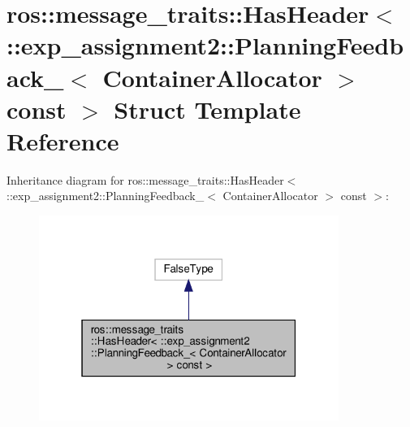 \hypertarget{structros_1_1message__traits_1_1HasHeader_3_01_1_1exp__assignment2_1_1PlanningFeedback___3_01Con25602f3962efee2b3ff1c0f0e827ff30}{}\section{ros\+:\+:message\+\_\+traits\+:\+:Has\+Header$<$ \+:\+:exp\+\_\+assignment2\+:\+:Planning\+Feedback\+\_\+$<$ Container\+Allocator $>$ const $>$ Struct Template Reference}
\label{structros_1_1message__traits_1_1HasHeader_3_01_1_1exp__assignment2_1_1PlanningFeedback___3_01Con25602f3962efee2b3ff1c0f0e827ff30}


Inheritance diagram for ros\+:\+:message\+\_\+traits\+:\+:Has\+Header$<$ \+:\+:exp\+\_\+assignment2\+:\+:Planning\+Feedback\+\_\+$<$ Container\+Allocator $>$ const $>$\+:
\nopagebreak
\begin{figure}[H]
\begin{center}
\leavevmode
\includegraphics[width=277pt]{structros_1_1message__traits_1_1HasHeader_3_01_1_1exp__assignment2_1_1PlanningFeedback___3_01Con37dd444d6895313c60dae629e4cfbc02}
\end{center}
\end{figure}


